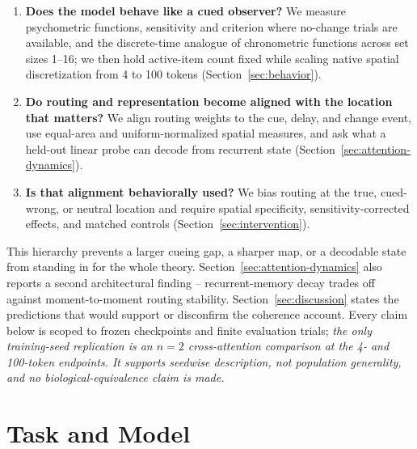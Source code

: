 \documentclass[10pt]{article}
\newcommand{\note}[1]{\textcolor{NoteGray}{\textit{#1}}}
\begin{document}
\begin{enumerate}
\item \textbf{Does the model behave like a cued observer?} We measure psychometric functions, sensitivity and criterion where no-change trials are available, and the discrete-time analogue of chronometric functions across set sizes 1--16; we then hold active-item count fixed while scaling native spatial discretization from 4 to 100 tokens (Section~\ref{sec:behavior}).
\item \textbf{Do routing and representation become aligned with the location that matters?} We align routing weights to the cue, delay, and change event, use equal-area and uniform-normalized spatial measures, and ask what a held-out linear probe can decode from recurrent state (Section~\ref{sec:attention-dynamics}).
\item \textbf{Is that alignment behaviorally used?} We bias routing at the true, cued-wrong, or neutral location and require spatial specificity, sensitivity-corrected effects, and matched controls (Section~\ref{sec:intervention}).
\end{enumerate}

This hierarchy prevents a larger cueing gap, a sharper map, or a decodable state from standing in for the whole theory. Section~\ref{sec:attention-dynamics} also reports a second architectural finding -- recurrent-memory decay trades off against moment-to-moment routing stability. Section~\ref{sec:discussion} states the predictions that would support or disconfirm the coherence account. Every claim below is scoped to frozen checkpoints and finite evaluation trials; \note{the only training-seed replication is an $n=2$ cross-attention comparison at the 4- and 100-token endpoints. It supports seedwise description, not population generality, and no biological-equivalence claim is made.}

\FloatBarrier
\section{Task and Model}\label{sec:task-model}
\end{document}
